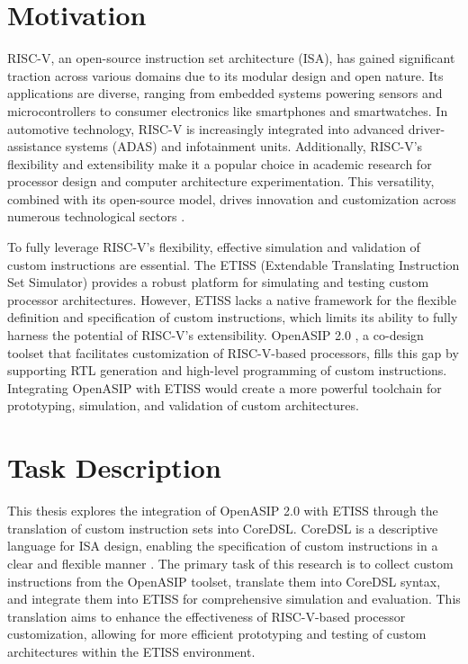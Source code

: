 \section{Motivation}
RISC-V, an open-source instruction set architecture (ISA), has gained significant traction across various domains due to its modular design and open nature. Its applications are diverse, ranging from embedded systems powering sensors and microcontrollers to consumer electronics like smartphones and smartwatches. In automotive technology, RISC-V is increasingly integrated into advanced driver-assistance systems (ADAS) and infotainment units. Additionally, RISC-V's flexibility and extensibility make it a popular choice in academic research for processor design and computer architecture experimentation. This versatility, combined with its open-source model, drives innovation and customization across numerous technological sectors \cite{Risc-v}.

To fully leverage RISC-V's flexibility, effective simulation and validation of custom instructions are essential. The ETISS (Extendable Translating Instruction Set Simulator) \cite{ETISS} provides a robust platform for simulating and testing custom processor architectures. However, ETISS lacks a native framework for the flexible definition and specification of custom instructions, which limits its ability to fully harness the potential of RISC-V's extensibility. OpenASIP 2.0 \cite{OpenASIP}, a co-design toolset that facilitates customization of RISC-V-based processors, fills this gap by supporting RTL generation and high-level programming of custom instructions. Integrating OpenASIP with ETISS would create a more powerful toolchain for prototyping, simulation, and validation of custom architectures.

\section{Task Description}
This thesis explores the integration of OpenASIP 2.0 with ETISS through the translation of custom instruction sets into CoreDSL. CoreDSL is a descriptive language for ISA design, enabling the specification of custom instructions in a clear and flexible manner \cite{CoreDSL}. The primary task of this research is to collect custom instructions from the OpenASIP toolset, translate them into CoreDSL syntax, and integrate them into ETISS for comprehensive simulation and evaluation. This translation aims to enhance the effectiveness of RISC-V-based processor customization, allowing for more efficient prototyping and testing of custom architectures within the ETISS environment.

